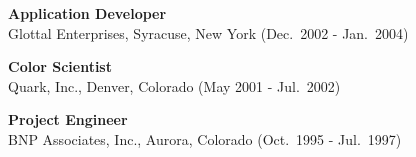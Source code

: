 \begin{minipage}{\minipagewidth}
\textbf{Application Developer}\\Glottal Enterprises, Syracuse, New York (Dec.~2002 - Jan.~2004)
\end{minipage}\vspace{\parskip}

\begin{minipage}{\minipagewidth}
\textbf{Color Scientist}\\Quark, Inc., Denver, Colorado (May 2001 - Jul.~2002)
\end{minipage}\vspace{\parskip}

\begin{minipage}{\minipagewidth}
\textbf{Project Engineer}\\BNP Associates, Inc., Aurora, Colorado (Oct.~1995 - Jul.~1997)
\end{minipage}\vspace{\parskip}

\newpage
\pagestyle{fancy}
\cfoot{}
\setlength{\headheight}{\myheadheight}
\setlength{\topmargin}{\mytopmargin}

